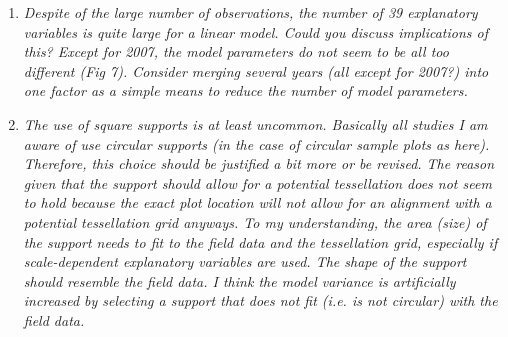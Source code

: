 \documentclass{article}
\begin{document}
\begin{enumerate}
  \answer{}
  
  
  
  \item \textit{Despite of the large number of observations, the number of 39 explanatory variables is quite large for a linear model. Could you discuss implications of this? Except for 2007, the model parameters do not seem to be all too different (Fig 7). Consider merging several years (all except for 2007?) into one factor as a simple means to reduce the number of model parameters.}
  
  
  
  
  
  
  \item \textit{The use of square supports is at least uncommon. Basically all studies I am aware of use circular supports (in the case of circular sample plots as here). Therefore, this choice should be justified a bit more or be revised. The reason given that the support should allow for a potential tessellation does not seem to hold because the exact plot location will not allow for an alignment with a potential tessellation grid anyways. To my understanding, the area (size) of the support needs to fit to the field data and the tessellation grid, especially if scale-dependent explanatory variables are used. The shape of the support should resemble the field data. I think the model variance is artificially increased by selecting a support that does not fit (i.e. is not circular) with the field data.}
  	

\end{enumerate}
\end{document}
